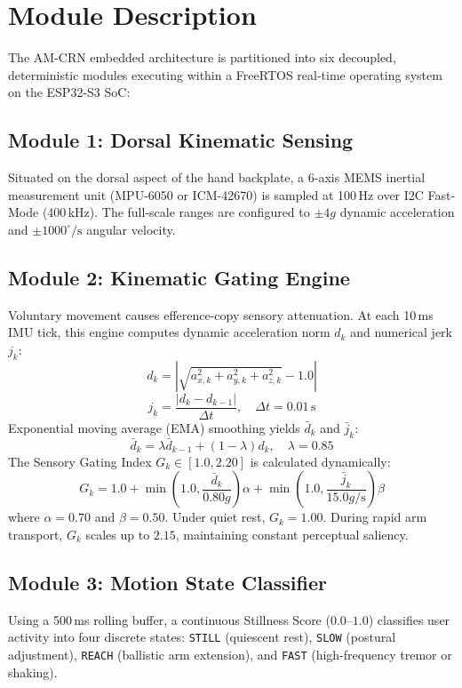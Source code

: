 \documentclass[10pt,twocolumn]{article}
\begin{document}
\section{Module Description}
The AM-CRN embedded architecture is partitioned into six decoupled, deterministic modules executing within a FreeRTOS real-time operating system on the ESP32-S3 SoC:

\subsection{Module 1: Dorsal Kinematic Sensing}
Situated on the dorsal aspect of the hand backplate, a 6-axis MEMS inertial measurement unit (MPU-6050 or ICM-42670) is sampled at 100\,Hz over I2C Fast-Mode (400\,kHz). The full-scale ranges are configured to $\pm 4g$ dynamic acceleration and $\pm 1000^\circ/\text{s}$ angular velocity. 

\subsection{Module 2: Kinematic Gating Engine}
Voluntary movement causes efference-copy sensory attenuation. At each 10\,ms IMU tick, this engine computes dynamic acceleration norm $d_k$ and numerical jerk $j_k$:
\begin{equation}
d_k = \left| \sqrt{a_{x,k}^2 + a_{y,k}^2 + a_{z,k}^2} - 1.0 \right|
\end{equation}
\begin{equation}
j_k = \frac{|d_k - d_{k-1}|}{\Delta t}, \quad \Delta t = 0.01\,\text{s}
\end{equation}
Exponential moving average (EMA) smoothing yields $\bar{d}_k$ and $\bar{j}_k$:
\begin{equation}
\bar{d}_k = \lambda \bar{d}_{k-1} + (1 - \lambda) d_k, \quad \lambda = 0.85
\end{equation}
The Sensory Gating Index $G_k \in [1.0, 2.20]$ is calculated dynamically:
\begin{equation}
G_k = 1.0 + \min\left(1.0, \frac{\bar{d}_k}{0.80g}\right) \alpha + \min\left(1.0, \frac{\bar{j}_k}{15.0g/\text{s}}\right) \beta
\end{equation}
where $\alpha = 0.70$ and $\beta = 0.50$. Under quiet rest, $G_k = 1.00$. During rapid arm transport, $G_k$ scales up to $2.15$, maintaining constant perceptual saliency.

\subsection{Module 3: Motion State Classifier}
Using a 500\,ms rolling buffer, a continuous Stillness Score ($0.0$--$1.0$) classifies user activity into four discrete states: \texttt{STILL} (quiescent rest), \texttt{SLOW} (postural adjustment), \texttt{REACH} (ballistic arm extension), and \texttt{FAST} (high-frequency tremor or shaking).
\end{document}
